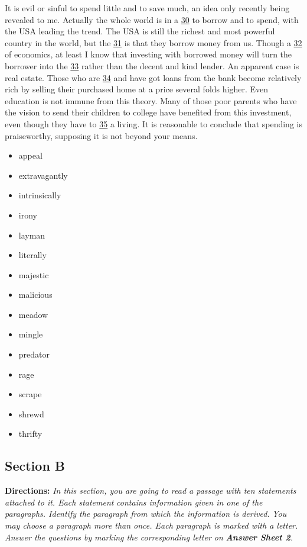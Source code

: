 \documentclass[UTF8,11pt]{ctexart}
\begin{document}
It is evil or sinful to spend little and to save much, an idea only recently being revealed to me. Actually the whole world is in a \uline{30} to borrow and to spend, with the USA leading the trend. The USA is still the richest and most powerful country in the world, but the \uline{31} is that they borrow money from us. Though a \uline{32} of economics, at least I know that investing with borrowed money will turn the borrower into the \uline{33} rather than the decent and kind lender. An apparent case is real estate. Those who are \uline{34} and have got loans from the bank become relatively rich by selling their purchased home at a price several folds higher. Even education is not immune from this theory. Many of those poor parents who have the vision to send their children to college have benefited from this investment, even though they have to \uline{35} a living. It is reasonable to conclude that spending is praiseworthy, supposing it is not beyond your means.


\begin{itemize}[leftmargin=2em,itemsep=.2em,topsep=.4em]\item[A.] appeal
\item[B.] extravagantly
\item[C.] intrinsically
\item[D.] irony
\item[E.] layman
\item[F.] literally
\item[G.] majestic
\item[H.] malicious
\item[I.] meadow
\item[J.] mingle
\item[K.] predator
\item[L.] rage
\item[M.] scrape
\item[N.] shrewd
\item[O.] thrifty
\end{itemize}

\subsection*{\textbf{Section B}}


\textbf{Directions:} \textit{In this section, you are going to read a passage with ten statements attached to it. Each statement} \textit{contains information given in one of the paragraphs. Identify the paragraph from which the information is derived.} \textit{You may choose a paragraph more than once. Each paragraph is marked with a letter. Answer the questions by} \textit{marking the corresponding letter on }\textbf{\textit{Answer Sheet 2}}\textit{.}
\end{document}
